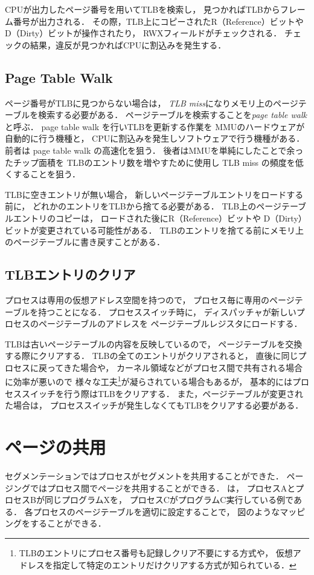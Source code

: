 CPUが出力したページ番号を用いてTLBを検索し，
見つかればTLBからフレーム番号が出力される．
その際，TLB上にコピーされたR（Reference）ビットや
D（Dirty）ビットが操作されたり，
RWXフィールドがチェックされる．
チェックの結果，違反が見つかればCPUに割込みを発生する．

\subsection{Page Table Walk}
ページ番号がTLBに見つからない場合は，
\emph{TLB miss}になりメモリ上のページテーブルを検索する必要がある．
ページテーブルを検索することを\emph{page table walk}と呼ぶ．
page table walk を行いTLBを更新する作業を
MMUのハードウェアが自動的に行う機種と，
CPUに割込みを発生しソフトウェアで行う機種がある．
前者は page table walk の高速化を狙う．
後者はMMUを単純にしたことで余ったチップ面積を
TLBのエントリ数を増やすために使用し
TLB miss の頻度を低くすることを狙う．

TLBに空きエントリが無い場合，
新しいページテーブルエントリをロードする前に，
どれかのエントリをTLBから捨てる必要がある．
TLB上のページテーブルエントリのコピーは，
ロードされた後にR（Reference）ビットや
D（Dirty）ビットが変更されている可能性がある．
TLBのエントリを捨てる前にメモリ上のページテーブルに書き戻すことがある．

\subsection{TLBエントリのクリア}
プロセスは専用の仮想アドレス空間を持つので，
プロセス毎に専用のページテーブルを持つことになる．
プロセススイッチ時に，
ディスパッチャが新しいプロセスのページテーブルのアドレスを
ページテーブルレジスタにロードする．

TLBは古いページテーブルの内容を反映しているので，
ページテーブルを交換する際にクリアする．
TLBの全てのエントリがクリアされると，
直後に同じプロセスに戻ってきた場合や，
カーネル領域などがプロセス間で共有される場合に効率が悪いので
様々な工夫\footnote{
  TLBのエントリにプロセス番号も記録しクリア不要にする方式や，
  仮想アドレスを指定して特定のエントリだけクリアする方式が知られている．
}が凝らされている場合もあるが，
基本的にはプロセススイッチを行う際はTLBをクリアする．
また，ページテーブルが変更された場合は，
プロセススイッチが発生しなくてもTLBをクリアする必要がある．

\section{ページの共用}
セグメンテーションではプロセスがセグメントを共用することができた．
ページングではプロセス間でページを共用することができる．
は，
プロセスAとプロセスBが同じプログラムXを，
プロセスCがプログラムC実行している例である．
各プロセスのページテーブルを適切に設定することで，
図のようなマッピングをすることができる．

